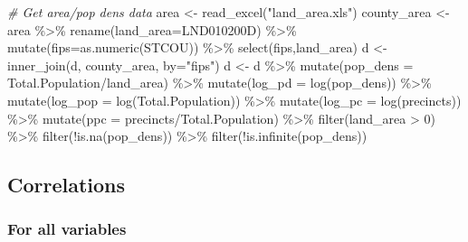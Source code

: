 \documentclass[
]{article}
\newenvironment{Shaded}{\begin{snugshade}}{\end{snugshade}}
\newcommand{\AttributeTok}[1]{\textcolor[rgb]{0.77,0.63,0.00}{#1}}
\newcommand{\CommentTok}[1]{\textcolor[rgb]{0.56,0.35,0.01}{\textit{#1}}}
\newcommand{\DecValTok}[1]{\textcolor[rgb]{0.00,0.00,0.81}{#1}}
\newcommand{\FunctionTok}[1]{\textcolor[rgb]{0.00,0.00,0.00}{#1}}
\newcommand{\NormalTok}[1]{#1}
\newcommand{\OtherTok}[1]{\textcolor[rgb]{0.56,0.35,0.01}{#1}}
\newcommand{\SpecialCharTok}[1]{\textcolor[rgb]{0.00,0.00,0.00}{#1}}
\newcommand{\StringTok}[1]{\textcolor[rgb]{0.31,0.60,0.02}{#1}}
\begin{document}
\begin{Shaded}
\begin{Highlighting}[]
\CommentTok{\# Get area/pop dens data}
\NormalTok{area }\OtherTok{\textless{}{-}} \FunctionTok{read\_excel}\NormalTok{(}\StringTok{"land\_area.xls"}\NormalTok{)}
\NormalTok{county\_area }\OtherTok{\textless{}{-}}\NormalTok{ area }\SpecialCharTok{\%\textgreater{}\%}
    \FunctionTok{rename}\NormalTok{(}\AttributeTok{land\_area=}\NormalTok{LND010200D) }\SpecialCharTok{\%\textgreater{}\%}
    \FunctionTok{mutate}\NormalTok{(}\AttributeTok{fips=}\FunctionTok{as.numeric}\NormalTok{(STCOU)) }\SpecialCharTok{\%\textgreater{}\%}
    \FunctionTok{select}\NormalTok{(fips,land\_area)}
\NormalTok{d }\OtherTok{\textless{}{-}} \FunctionTok{inner\_join}\NormalTok{(d, county\_area, }\AttributeTok{by=}\StringTok{"fips"}\NormalTok{)}
\NormalTok{d }\OtherTok{\textless{}{-}}\NormalTok{ d }\SpecialCharTok{\%\textgreater{}\%}
  \FunctionTok{mutate}\NormalTok{(}\AttributeTok{pop\_dens =}\NormalTok{ Total.Population}\SpecialCharTok{/}\NormalTok{land\_area) }\SpecialCharTok{\%\textgreater{}\%}
  \FunctionTok{mutate}\NormalTok{(}\AttributeTok{log\_pd =} \FunctionTok{log}\NormalTok{(pop\_dens)) }\SpecialCharTok{\%\textgreater{}\%}
  \FunctionTok{mutate}\NormalTok{(}\AttributeTok{log\_pop =} \FunctionTok{log}\NormalTok{(Total.Population)) }\SpecialCharTok{\%\textgreater{}\%}
  \FunctionTok{mutate}\NormalTok{(}\AttributeTok{log\_pc =} \FunctionTok{log}\NormalTok{(precincts)) }\SpecialCharTok{\%\textgreater{}\%}
  \FunctionTok{mutate}\NormalTok{(}\AttributeTok{ppc =}\NormalTok{ precincts}\SpecialCharTok{/}\NormalTok{Total.Population) }\SpecialCharTok{\%\textgreater{}\%}
  \FunctionTok{filter}\NormalTok{(land\_area }\SpecialCharTok{\textgreater{}} \DecValTok{0}\NormalTok{) }\SpecialCharTok{\%\textgreater{}\%}
  \FunctionTok{filter}\NormalTok{(}\SpecialCharTok{!}\FunctionTok{is.na}\NormalTok{(pop\_dens)) }\SpecialCharTok{\%\textgreater{}\%}
  \FunctionTok{filter}\NormalTok{(}\SpecialCharTok{!}\FunctionTok{is.infinite}\NormalTok{(pop\_dens))}
\end{Highlighting}
\end{Shaded}

\hypertarget{correlations}{%
\subsection{Correlations}\label{correlations}}

\hypertarget{for-all-variables}{%
\subsubsection{For all variables}\label{for-all-variables}}
\end{document}
